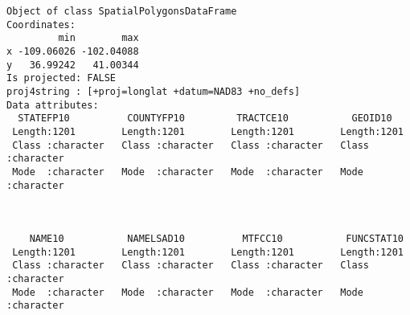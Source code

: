 \documentclass[
  12pt,
]{article}
\begin{document}
\begin{verbatim}
Object of class SpatialPolygonsDataFrame
Coordinates:
         min        max
x -109.06026 -102.04088
y   36.99242   41.00344
Is projected: FALSE 
proj4string : [+proj=longlat +datum=NAD83 +no_defs]
Data attributes:
  STATEFP10          COUNTYFP10         TRACTCE10           GEOID10         
 Length:1201        Length:1201        Length:1201        Length:1201       
 Class :character   Class :character   Class :character   Class :character  
 Mode  :character   Mode  :character   Mode  :character   Mode  :character  
                                                                            
                                                                            
                                                                            
    NAME10           NAMELSAD10          MTFCC10           FUNCSTAT10       
 Length:1201        Length:1201        Length:1201        Length:1201       
 Class :character   Class :character   Class :character   Class :character  
 Mode  :character   Mode  :character   Mode  :character   Mode  :character  
                                                                            
                                                                            
                                                                            

\end{verbatim}
\end{document}
